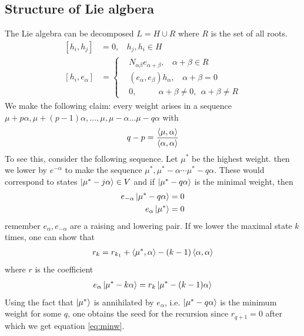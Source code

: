 \documentclass[a4paper,12pt]{article}
\begin{document}
\subsection{Structure of Lie algbera}
The Lie algebra can be decomposed $L=H\cup R$ where $R$ is the set of all roots.
\begin{equation}
	\begin{aligned}
		\left[h_i,h_j\right]&=0,~~~~h_j,h_i\in H\\
		[h_i,e_\alpha]&=\begin{cases}
			&N_{\alpha \beta} e_{\alpha+\beta},~~~~\alpha+\beta \in R\\
			&(e_{\alpha},e_\beta)h_\alpha,~~~~\alpha+\beta  =0\\
			&0,~~~~~~~~~~~~\alpha+\beta  \neq0, ~~\alpha+\beta  \neq R
		\end{cases}
	\end{aligned}
\end{equation}
We make the following claim: every weight arises in a sequence $\mu+p\alpha,\mu+(p-1)\alpha,\dots , \mu,\mu-\alpha\dots \mu-q\alpha$ with
\begin{equation}  \label{eq:minw}
	\begin{aligned}
		q-p=\frac{\expval{\mu,\alpha}}{\expval{\alpha,\alpha}}
	\end{aligned}
\end{equation}
To see this, consider the following sequence. Let $\mu^*$ be the highest weight. then we lower by $e^{-\alpha}$ to make the sequence $\mu^*,\mu^*-\alpha\cdots \mu^*-q\alpha$. These would correspond to states $\ket{\mu^*-j\alpha}\in V$ and if $\ket{\mu^*-q\alpha}$ is the minimal weight, then 
\begin{equation}
	\begin{aligned}
		e_{-\alpha}\ket{\mu^*-q\alpha}&=0\\
		e_\alpha \ket {\mu^*}&=0
	\end{aligned}
\end{equation}
remember $e_\alpha,e_{-\alpha}$ are a raising and lowering pair. If we lower the maximal state $k$ times, one can show that
\begin{equation}
	\begin{aligned}
		r_k=r_{k_1}+\expval{\mu^*,\alpha}-(k-1)\expval{\alpha,\alpha}
	\end{aligned}
\end{equation}
where $r$ is the coefficient
\begin{equation}
	\begin{aligned}
		e_\alpha\ket{\mu^*-k\alpha}=r_k\ket{\mu^*-(k-1)\alpha}
	\end{aligned}
\end{equation}
Using the fact that $\ket{\mu^*}$ is annihilated by $e_\alpha$, i.e. $\ket{\mu^*-q\alpha}$ is the minimum weight for some $q$, one obtains the seed for the recursion since $r_{q+1}=0$ after which we get equation \eqref{eq:minw}.
\end{document}
